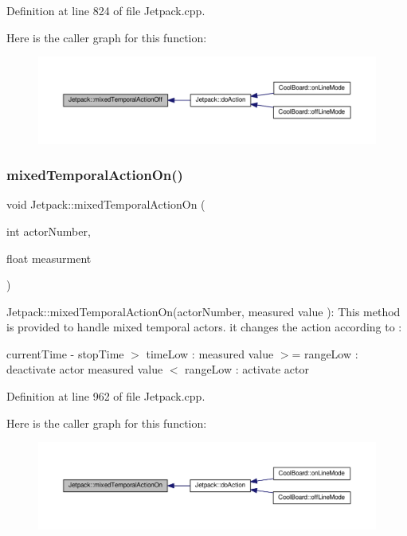 Definition at line 824 of file Jetpack.\+cpp.

Here is the caller graph for this function\+:\nopagebreak
\begin{figure}[H]
\begin{center}
\leavevmode
\includegraphics[width=350pt]{class_jetpack_af2f567ef6311a8fc2f7bb948837667b7_icgraph}
\end{center}
\end{figure}
\mbox{\label{class_jetpack_af44bc8a08818e4433dfb1c7104601f12}} 
\subsubsection{\texorpdfstring{mixed\+Temporal\+Action\+On()}{mixedTemporalActionOn()}}
{\footnotesize\ttfamily void Jetpack\+::mixed\+Temporal\+Action\+On (\begin{DoxyParamCaption}\item[{int}]{actor\+Number,  }\item[{float}]{measurment }\end{DoxyParamCaption})}

Jetpack\+::mixed\+Temporal\+Action\+On(actor\+Number, measured value )\+: This method is provided to handle mixed temporal actors. it changes the action according to \+:

current\+Time -\/ stop\+Time $>$ time\+Low \+: measured value $>$= range\+Low \+: deactivate actor measured value $<$ range\+Low \+: activate actor 

Definition at line 962 of file Jetpack.\+cpp.

Here is the caller graph for this function\+:\nopagebreak
\begin{figure}[H]
\begin{center}
\leavevmode
\includegraphics[width=350pt]{class_jetpack_af44bc8a08818e4433dfb1c7104601f12_icgraph}
\end{center}
\end{figure}
\mbox{\label{class_jetpack_a65ce9533c39fa71e4945b970bf14b980}} 
